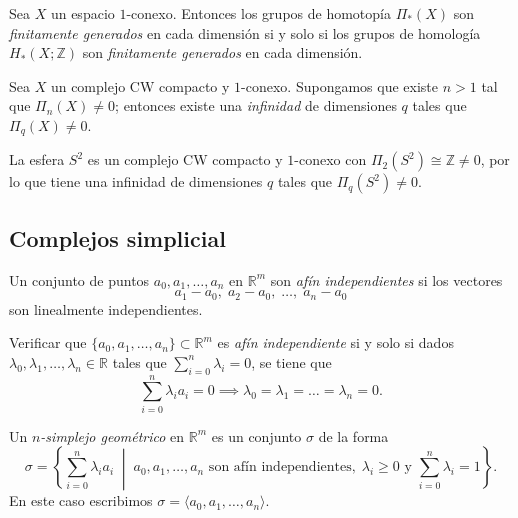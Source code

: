 \begin{teorema}[Serre]
Sea $X$ un espacio $1$-conexo. Entonces los grupos de homotopía $\Pi_*(X)$ son \textit{finitamente generados} en cada dimensión si y solo si los grupos de homología $H_*(X; \mathbb{Z})$ son \textit{finitamente generados} en cada dimensión.
\end{teorema}

\begin{teorema}[Serre]
Sea $X$ un complejo CW compacto y $1$-conexo. Supongamos que existe $n > 1$ tal que $\Pi_n(X) \neq 0$; entonces existe una \textit{infinidad} de dimensiones $q$ tales que $\Pi_q(X) \neq 0$.
\end{teorema}

\begin{ejemplo}
La esfera $S^2$ es un complejo CW compacto y $1$-conexo con $\Pi_2(S^2) \cong \mathbb{Z} \neq 0$, por lo que tiene una infinidad de dimensiones $q$ tales que $\Pi_q(S^2) \neq 0$.
\end{ejemplo}



\subsection{Complejos simplicial}
\begin{definicion}
Un conjunto de puntos $a_0, a_1, \dots, a_n$ en $\mathbb{R}^m$ son \textit{afín independientes} si los vectores
\[
a_1 - a_0, \; a_2 - a_0, \; \dots, \; a_n - a_0
\]
son linealmente independientes.
\end{definicion}

\begin{ejercicio}
Verificar que $\{a_0, a_1, \dots, a_n\} \subset \mathbb{R}^m$ es \textit{afín independiente} si y solo si dados $\lambda_0, \lambda_1, \dots, \lambda_n \in \mathbb{R}$ tales que $\sum_{i=0}^n \lambda_i = 0$, se tiene que
\[
\sum_{i=0}^n \lambda_i a_i = 0 \implies \lambda_0 = \lambda_1 = \dots = \lambda_n = 0.
\]
\end{ejercicio}

\begin{definicion}
Un \textit{$n$-simplejo geométrico} en $\mathbb{R}^m$ es un conjunto $\sigma$ de la forma
\[
\sigma = \left\{ \sum_{i=0}^n \lambda_i a_i \;\middle|\; a_0, a_1, \dots, a_n \text{ son afín independientes}, \; \lambda_i \geq 0 \text{ y } \sum_{i=0}^n \lambda_i = 1 \right\}.
\]
En este caso escribimos $\sigma = \langle a_0, a_1, \dots, a_n \rangle$.
\end{definicion}

